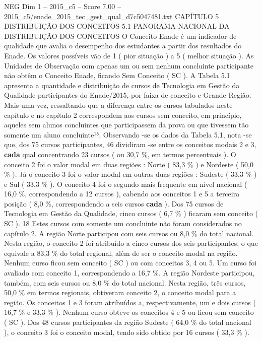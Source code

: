 \begin{textsample}{NEG Dim 1 – 2015\_c5 – Score 7.00 – 2015\_c5/enade\_2015\_tec\_gest\_qual\_d7c5047481.txt}  \label{ex:f1_neg_345}
CAPÍTULO 5 DISTRIBUIÇÃO DOS CONCEITOS 5.1 PANORAMA NACIONAL DA DISTRIBUIÇÃO DOS CONCEITOS O Conceito Enade é um indicador de qualidade que avalia o desempenho dos estudantes a partir dos resultados do Enade.
Os valores possíveis vão de 1 ( pior situação ) a 5 ( melhor situação ).
As Unidades de Observação com apenas um ou sem nenhum concluinte participante não obtêm o Conceito Enade, ficando Sem Conceito ( SC ).
A Tabela 5.1 apresenta a quantidade e distribuição de cursos de Tecnologia em Gestão da Qualidade participantes do Enade/2015, por faixa de conceito e Grande Região.
Mais uma vez, ressaltando que a diferença entre os cursos tabulados neste capítulo e no capítulo 2 correspondem aos cursos sem conceito, em princípio, aqueles sem alunos concluintes que participassem da prova ou que tivessem tão somente um aluno concluinte¹⁸.
Observando -se os dados da Tabela 5.1, nota -se que, dos 75 cursos participantes, 46 dividiram -se entre os conceitos modais 2 e 3, \textbf{cada} qual concentrando 23 cursos ( ou 30,7 \%, em termos percentuais ).
O conceito 2 foi o valor modal em duas regiões : Norte ( 83,3 \% ) e Nordeste ( 50,0 \% ).
Já o conceito 3 foi o valor modal em outras duas regiões : Sudeste ( 33,3 \% ) e Sul ( 33,3 \% ).
O conceito 4 foi o segundo mais frequente em nível nacional ( 16,0 \%, correspondendo a 12 cursos ), cabendo aos conceitos 1 e 5 a terceira posição ( 8,0 \%, correspondendo a seis cursos \textbf{cada} ).
Dos 75 cursos de Tecnologia em Gestão da Qualidade, cinco cursos ( 6,7 \% ) ficaram sem conceito ( SC ). 18 Estes cursos com somente um concluinte não foram considerados no capítulo 2.
A região Norte participou com seis cursos ou 8,0 \% do total nacional.
Nesta região, o conceito 2 foi atribuído a cinco cursos dos seis participantes, o que equivale a 83,3 \% do total regional, além de ser o conceito modal na região.
Nenhum curso ficou sem conceito ( SC ) ou com conceitos 3, 4 ou 5.
Um curso foi avaliado com conceito 1, correspondendo a 16,7 \%.
A região Nordeste participou, também, com seis cursos ou 8,0 \% do total nacional.
Nesta região, três cursos, 50,0 \% em termos regionais, obtiveram conceito 2, o conceito modal para a região.
Os conceitos 1 e 3 foram atribuídos a, respectivamente, um e dois cursos ( 16,7 \% e 33,3 \% ).
Nenhum curso obteve os conceitos 4 e 5 ou ficou sem conceito ( SC ).
Dos 48 cursos participantes da região Sudeste ( 64,0 \% do total nacional ), o conceito 3 foi o conceito modal, tendo sido obtido por 16 cursos ( 33,3 \% ).

\end{textsample}
